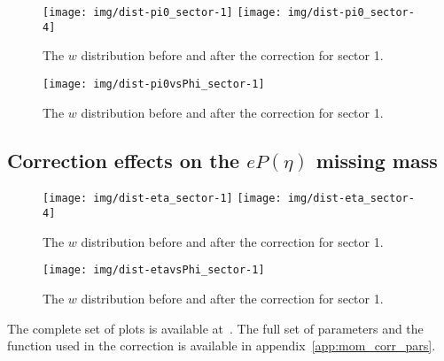 \begin{figure}[h]
    \centering
    \texttt{[image: img/dist-pi0\_sector-1]}
    \texttt{[image: img/dist-pi0\_sector-4]}
    \caption{The $w$ distribution before and after the correction for sector 1.}
    \label{fig:dist-pi0_sector-1}
\end{figure}


\begin{figure}[h]
    \centering
    \texttt{[image: img/dist-pi0vsPhi\_sector-1]}
    \caption{The $w$ distribution before and after the correction for sector 1.}
    \label{fig:dist-pi0vsPhi_sector-1}
\end{figure}



\clearpage\newpage
\subsection{Correction effects on the $eP(\eta)$ missing mass}

\begin{figure}[h]
    \centering
    \texttt{[image: img/dist-eta\_sector-1]}
    \texttt{[image: img/dist-eta\_sector-4]}
    \caption{The $w$ distribution before and after the correction for sector 1.}
    \label{fig:dist-eta_sector-1}
\end{figure}


\begin{figure}[h]
    \centering
    \texttt{[image: img/dist-etavsPhi\_sector-1]}
    \caption{The $w$ distribution before and after the correction for sector 1.}
    \label{fig:dist-etavsPhi_sector-1}
\end{figure}





The complete set of plots is available at~\cite{bib:e_kin_cor}. The full set of parameters and the function used in
the correction is available in appendix~\ref{app:mom_corr_pars}.


